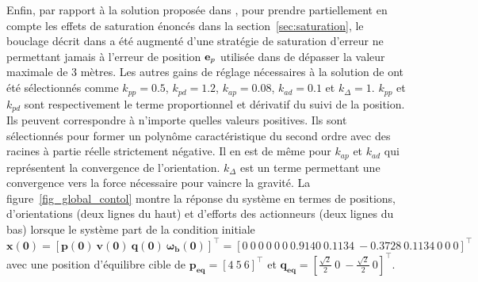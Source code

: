 Enfin, par rapport à la solution proposée dans \cite{2020e-MicCenZacFra}, pour prendre partiellement en compte les effets de saturation énoncés dans la section~\ref{sec:saturation}, le bouclage décrit dans \cite{2020e-MicCenZacFra} a été augmenté d'une stratégie de saturation d'erreur ne permettant jamais à l'erreur de position $\boldsymbol{\rm e}_p$ utilisée dans \cite[eqn. (22)]{2020e-MicCenZacFra} de dépasser la valeur maximale de 3 mètres. Les autres gains de réglage nécessaires à la solution de \cite{2020e-MicCenZacFra} ont été sélectionnés comme $k_{pp} = 0.5$, $k_{pd} = 1.2$, $k_{ap} = 0.08$, $k_{ad} = 0.1$ et $k_{\Delta} = 1$. $k_{pp}$ et $k_{pd}$ sont respectivement le terme proportionnel et dérivatif du suivi de la position. Ils peuvent correspondre à n'importe quelles valeurs positives. Ils sont sélectionnés pour former un polynôme caractéristique du second ordre avec des racines à partie réelle strictement négative. Il en est de même pour $k_{ap}$ et $k_{ad}$ qui représentent la convergence de l'orientation. $k_{\Delta}$ est un terme permettant une convergence vers la force nécessaire pour vaincre la gravité. La figure~\ref{fig_global_contol} montre la réponse du système en termes de positions, d'orientations (deux lignes du haut) et d'efforts des actionneurs (deux lignes du bas) lorsque le système part de la condition initiale $\boldsymbol{x(0)} = [\boldsymbol{p(0)}~ \boldsymbol{v(0)}~ \boldsymbol{q(0)}~ \boldsymbol{\omega_b(0)}]^\top = [0~0~0 ~ 0~0~0 ~0. 9140 ~0.1134~ -0.3728~ 0. 1134~ 0~ 0~ 0]^\top $ avec une position d'équilibre cible de $\boldsymbol{p_{\text{eq}}} = [4~5~6]^\top$ et $\boldsymbol{q_{\text{eq}}} = [\frac{\sqrt{2}}{2}~0~-\frac{\sqrt{2}}{2}~0]^\top$. 

